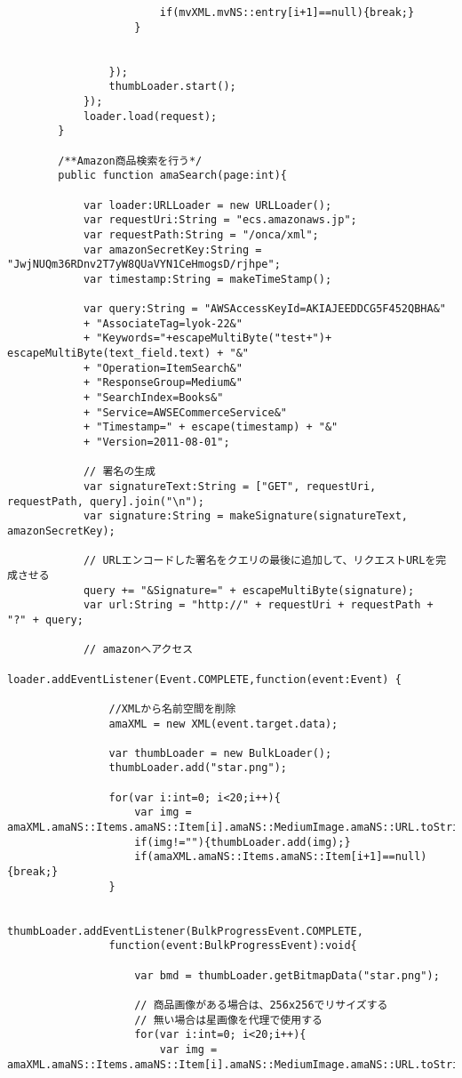 {\begin{verbatim}
						if(mvXML.mvNS::entry[i+1]==null){break;}
					}
					
					
				});
				thumbLoader.start();
			});
			loader.load(request);
		}
		
		/**Amazon商品検索を行う*/
		public function amaSearch(page:int){
			
			var loader:URLLoader = new URLLoader();
			var requestUri:String = "ecs.amazonaws.jp";
			var requestPath:String = "/onca/xml";
			var amazonSecretKey:String = "JwjNUQm36RDnv2T7yW8QUaVYN1CeHmogsD/rjhpe";
			var timestamp:String = makeTimeStamp();
			
			var query:String = "AWSAccessKeyId=AKIAJEEDDCG5F452QBHA&"
			+ "AssociateTag=lyok-22&"
			+ "Keywords="+escapeMultiByte("test+")+ escapeMultiByte(text_field.text) + "&"
			+ "Operation=ItemSearch&"
			+ "ResponseGroup=Medium&"
			+ "SearchIndex=Books&"
			+ "Service=AWSECommerceService&"
			+ "Timestamp=" + escape(timestamp) + "&"
			+ "Version=2011-08-01";
			
			// 署名の生成
			var signatureText:String = ["GET", requestUri, requestPath, query].join("\n");
			var signature:String = makeSignature(signatureText, amazonSecretKey);
			
			// URLエンコードした署名をクエリの最後に追加して、リクエストURLを完成させる
			query += "&Signature=" + escapeMultiByte(signature);
			var url:String = "http://" + requestUri + requestPath + "?" + query;
			
			// amazonへアクセス
			loader.addEventListener(Event.COMPLETE,function(event:Event) {
									
				//XMLから名前空間を削除
				amaXML = new XML(event.target.data);
				
				var thumbLoader = new BulkLoader();
				thumbLoader.add("star.png");
				
				for(var i:int=0; i<20;i++){
					var img = amaXML.amaNS::Items.amaNS::Item[i].amaNS::MediumImage.amaNS::URL.toString();
					if(img!=""){thumbLoader.add(img);}
					if(amaXML.amaNS::Items.amaNS::Item[i+1]==null){break;}
				}
				
				thumbLoader.addEventListener(BulkProgressEvent.COMPLETE,
				function(event:BulkProgressEvent):void{
											 
					var bmd = thumbLoader.getBitmapData("star.png");
					
					// 商品画像がある場合は、256x256でリサイズする
					// 無い場合は星画像を代理で使用する
					for(var i:int=0; i<20;i++){
						var img = amaXML.amaNS::Items.amaNS::Item[i].amaNS::MediumImage.amaNS::URL.toString();
						

\end{verbatim}}
